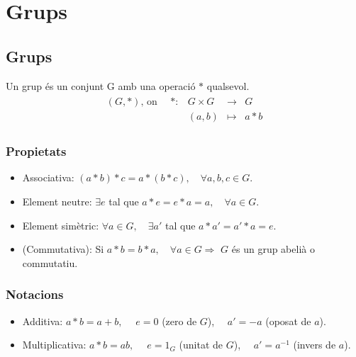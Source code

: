 \section{Grups}
\subsection{Grups}
Un grup és un conjunt G amb una operació $\ast$ qualsevol.
\begin{align} 
\begin{matrix}
    (G, \ast ) \textrm{, on } \quad \ast : & G \times G & \to &G \\
    & (a,b) & \mapsto & a \ast b
\end{matrix}
\end{align}

\subsubsection*{Propietats}
\begin{itemize}
    \item Associativa: $(a \ast b) \ast c = a \ast (b \ast c), \quad \forall a,b,c \in G$.
    \item Element neutre: $\exists e$ tal que $a \ast e = e \ast a = a, \quad \forall a \in G$.
    \item Element simètric: $\forall a \in G, \quad \exists a'$ tal que $a \ast a' = a' \ast a = e$. 
    \item (Commutativa): Si $a \ast b = b \ast a, \quad \forall a \in G \Rightarrow$ $G$ és un grup abelià o commutatiu.
\end{itemize}

\subsubsection*{Notacions}
\begin{itemize}
    \item Additiva: 
        \subitem $a \ast b = a+b, \;\quad e = 0$ (zero de $G$), $\quad a' = -a$ (oposat de $a$). 
    \item Multiplicativa: 
    \subitem $a \ast b = ab, \;\quad e = 1_{G}$ (unitat de $G$), $\quad a' = a^{-1}$ (invers de $a$).
\end{itemize}

